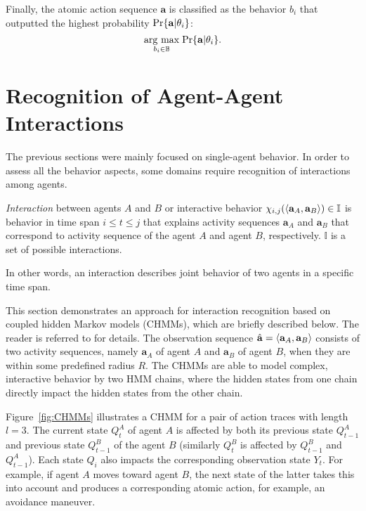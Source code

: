 Finally, the atomic action sequence $\mathbf{a}$ is classified as the behavior $b_i$ that outputted the highest probability $\text{Pr}\{\mathbf{a}|\theta_i\}$:
\begin{equation}
\label{eq:hmm-max}
\underset{b_i \in \mathbb{B}}{\operatorname{arg}\,\operatorname{max}}\; \text{Pr}\{\mathbf{a}|\theta_i\}.
\end{equation}

%
%
\section{Recognition of Agent-Agent Interactions}
\label{sec:ar:interactions}
The previous sections were mainly focused on single-agent behavior. In order to assess all the behavior aspects, some domains require recognition of interactions among agents.

\begin{definition}
\label{def:observation_vector}
	\emph{Interaction} between agents $A$ and $B$ or interactive behavior $\chi_{i, j}(\langle \mathbf{a}_A,\mathbf{a}_B \rangle) \in \mathbb{I}$ is behavior in time span $i \leq t \leq j$ that explains activity sequences $\mathbf{a}_A$ and $\mathbf{a}_B$ that correspond to activity sequence of the agent $A$ and agent $B$, respectively. $\mathbb{I}$ is a set of possible interactions.
\end{definition}

\noindent In other words, an interaction describes joint behavior of two agents in a specific time span. 

This section demonstrates an approach for interaction recognition based on coupled hidden Markov models (CHMMs), which are briefly described below. The reader is referred to \cite{Brand} for details. The observation sequence $\hat{\mathbf{a}}=\langle \mathbf{a}_A, \mathbf{a}_B \rangle$ consists of two activity sequences, namely $\mathbf{a}_A$ of agent $A$ and $\mathbf{a}_B$ of agent $B$, when they are within some predefined radius $R$. The CHMMs are able to model complex, interactive behavior by two HMM chains, where the hidden states from one chain directly impact the hidden states from the other chain. 

Figure~\ref{fig:CHMMs} illustrates a CHMM for a pair of action traces with length $l=3$. The current state $Q_t^A$ of agent $A$ is affected by both its previous state $Q_{t-1}^A$ and previous state $Q_{t-1}^B$ of the agent $B$ (similarly $Q_t^B$ is affected by $Q_{t-1}^B$ and $Q_{t-1}^A$). Each state $Q_i$ also impacts the corresponding observation state $Y_t$. 
For example, if agent $A$ moves toward agent $B$, the next state of the latter takes this into account and produces a corresponding atomic action, for example, an avoidance maneuver. 

